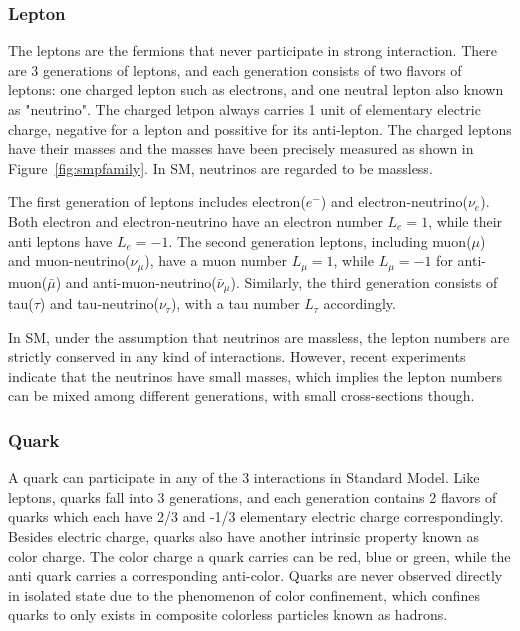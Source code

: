 \subsubsection{Lepton}
The leptons are the fermions that never participate in strong interaction. There are 3 generations of leptons, and each generation consists of two flavors of leptons: one charged lepton such as electrons, and one neutral lepton also known as "neutrino". The charged letpon always carries 1 unit of elementary electric charge, negative for a lepton and possitive for its anti-lepton. The charged leptons have their masses and the masses have been precisely measured as shown in Figure~\ref{fig:smpfamily}. In SM, neutrinos are regarded to be massless.

\vspace{0.3cm}
The first generation of leptons includes electron($e^{-}$) and electron-neutrino($\nu _{e}$). Both electron and electron-neutrino have an electron number $L_{e}=1$, while their anti leptons have $L_{e}=-1$. The second generation leptons, including muon($\mu$) and muon-neutrino($\nu_{\mu}$), have a muon number $L_{\mu}=1$, while $L_{\mu }=-1$ for anti-muon($\bar{\mu}$) and anti-muon-neutrino($\bar{\nu} _{\mu }$). Similarly, the third generation consists of tau($\tau$) and tau-neutrino($\nu _{\tau }$), with a tau number $L_{\tau}$ accordingly.

\vspace{0.3cm}
In SM, under the assumption that neutrinos are massless, the lepton numbers are strictly conserved in any kind of interactions. However, recent experiments\cite{neutrinoOscillation1}\cite{neutrinoOscillation2} indicate that the neutrinos have small masses, which implies the lepton numbers can be mixed among different generations,  with small cross-sections though.
\subsubsection{Quark}
A quark can participate in any of the 3 interactions in Standard Model. Like leptons, quarks fall into 3 generations, and each generation contains 2 flavors of quarks which each have 2/3 and -1/3 elementary electric charge correspondingly. Besides electric charge, quarks also have another intrinsic property known as color charge. The color charge a quark carries can be red, blue or green, while the anti quark carries a corresponding anti-color. Quarks are never observed directly in isolated state due to the phenomenon of color confinement, which confines quarks to only exists in composite colorless particles known as hadrons.

